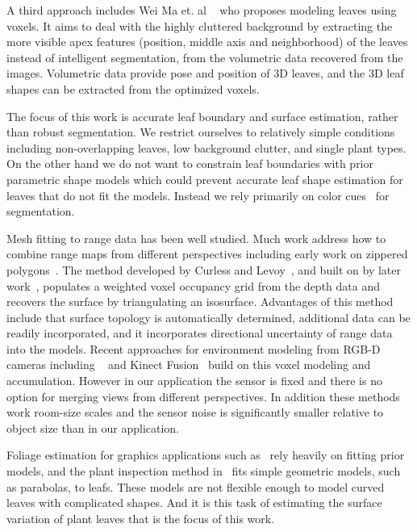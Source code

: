 A third approach includes Wei Ma et. al ~\cite{ma2008image} who proposes modeling leaves using voxels. It aims to deal with the highly cluttered background by extracting the more visible apex features (position, middle axis and neighborhood) of the leaves instead of intelligent segmentation, from the volumetric data recovered from the images.  Volumetric data provide pose and position of $3$D leaves, and the $3$D leaf shapes can be extracted from the optimized voxels.

The focus of this work is accurate leaf boundary and surface estimation, rather than robust segmentation.  We restrict ourselves to relatively simple conditions including non-overlapping leaves, low background clutter, and single plant types.    On the other hand we do not want to constrain leaf boundaries with prior parametric shape models which could prevent accurate leaf shape estimation for leaves that do not fit the models. Instead we rely primarily on color cues~\cite{achanta2012slic} for segmentation.

Mesh fitting to range data has been well studied.  Much work address how to combine range maps from different perspectives including early work on zippered polygons~\cite{Turk1994}.  The method developed by Curless and Levoy~\cite{Curless:1996}, and built on by later work~\cite{Izadi:2011,Newcombe:2011}, populates a weighted voxel occupancy grid from the depth data and recovers the surface by triangulating an isosurface.  Advantages of this method include that surface topology is automatically determined, additional data can be readily incorporated, and it incorporates directional uncertainty of range data into the models.  Recent approaches for environment modeling from RGB-D cameras including ~\cite{Xu2011} and Kinect Fusion~\cite{Izadi:2011,Newcombe:2011} build on this voxel modeling and accumulation.  However in our application the sensor is fixed and there is no option for merging views from different perspectives.  In addition these methods work room-size scales and the sensor noise is significantly smaller relative to object size than in our application.  

Foliage estimation for graphics applications such as~\cite{Quan:2006,Bradley:2013} rely heavily on fitting prior models, and the plant inspection method in~\cite{Alenya2011,Alenya2013} fits simple geometric models, such as parabolas, to leafs.  These models are not flexible enough to model curved leaves with complicated shapes.  And it is this task of estimating the surface variation of plant leaves that is the focus of this work.


